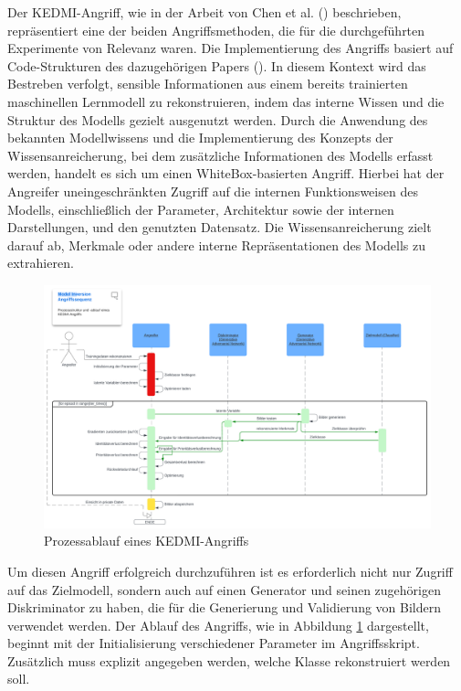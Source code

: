 Der \glqq KEDMI\grqq-Angriff, wie in der Arbeit von Chen et al. (\cite{chen_knowledge-enriched_2021}) beschrieben, repräsentiert eine der beiden Angriffsmethoden, die für die durchgeführten Experimente von Relevanz waren. Die Implementierung des Angriffs basiert auf Code-Strukturen des dazugehörigen Papers (\cite{chen_knowledge-enriched_2021}). In diesem Kontext wird das Bestreben verfolgt, sensible Informationen aus einem bereits trainierten maschinellen Lernmodell zu rekonstruieren, indem das interne Wissen und die Struktur des Modells gezielt ausgenutzt werden. Durch die Anwendung des bekannten Modellwissens und die Implementierung des Konzepts der \glqq Wissensanreicherung\grqq, bei dem zusätzliche Informationen des Modells erfasst werden, handelt es sich um einen \glqq WhiteBox-basierten\grqq{} Angriff. Hierbei hat der Angreifer uneingeschränkten Zugriff auf die internen Funktionsweisen des Modells, einschließlich der Parameter, Architektur sowie der internen Darstellungen, und den genutzten Datensatz. Die Wissensanreicherung zielt darauf ab, Merkmale oder andere interne Repräsentationen des Modells zu extrahieren.

\begin{figure}
	\centering
	\includegraphics[width=1\linewidth]{Bilder/KEDMI_PROCESS.png}
	\caption{Prozessablauf eines KEDMI-Angriffs}
	\label{img:kedmi_process}
\end{figure}

Um diesen Angriff erfolgreich durchzuführen ist es erforderlich nicht nur Zugriff auf das Zielmodell, sondern auch auf einen Generator und seinen zugehörigen Diskriminator zu haben, die für die Generierung und Validierung von Bildern verwendet werden. Der Ablauf des Angriffs, wie in Abbildung \ref{img:kedmi_process} dargestellt, beginnt mit der Initialisierung verschiedener Parameter im Angriffsskript. Zusätzlich muss explizit angegeben werden, welche Klasse rekonstruiert werden soll.

